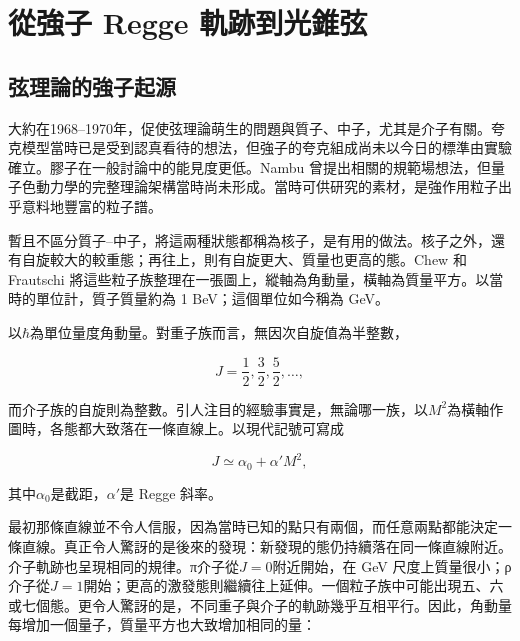 \chapter{從強子 Regge 軌跡到光錐弦}


\section{弦理論的強子起源}

大約在1968--1970年，促使弦理論萌生的問題與質子、中子，尤其是介子有關。夸克模型當時已是受到認真看待的想法，但強子的夸克組成尚未以今日的標準由實驗確立。膠子在一般討論中的能見度更低。Nambu 曾提出相關的規範場想法，但量子色動力學的完整理論架構當時尚未形成。當時可供研究的素材，是強作用粒子出乎意料地豐富的粒子譜。

暫且不區分質子--中子，將這兩種狀態都稱為核子，是有用的做法。核子之外，還有自旋較大的較重態；再往上，則有自旋更大、質量也更高的態。Chew 和 Frautschi 將這些粒子族整理在一張圖上，縱軸為角動量，橫軸為質量平方。以當時的單位計，質子質量約為 1 BeV；這個單位如今稱為 GeV。

以\(\hbar\)為單位量度角動量。對重子族而言，無因次自旋值為半整數，

\begin{equation}
  J=\frac12,\frac32,\frac52,\ldots,
\end{equation}

而介子族的自旋則為整數。引人注目的經驗事實是，無論哪一族，以\(M^2\)為橫軸作圖時，各態都大致落在一條直線上。以現代記號可寫成

\begin{equation}
  J\simeq \alpha_0+\alpha' M^2,
  \label{eq:l01-regge-trajectory}
\end{equation}

其中\(\alpha_0\)是截距，\(\alpha'\)是 Regge 斜率。

最初那條直線並不令人信服，因為當時已知的點只有兩個，而任意兩點都能決定一條直線。真正令人驚訝的是後來的發現：新發現的態仍持續落在同一條直線附近。介子軌跡也呈現相同的規律。{\proseunicodefont π}介子從\(J=0\)附近開始，在 GeV 尺度上質量很小；{\proseunicodefont ρ}介子從\(J=1\)開始；更高的激發態則繼續往上延伸。一個粒子族中可能出現五、六或七個態。更令人驚訝的是，不同重子與介子的軌跡幾乎互相平行。因此，角動量每增加一個量子，質量平方也大致增加相同的量：

